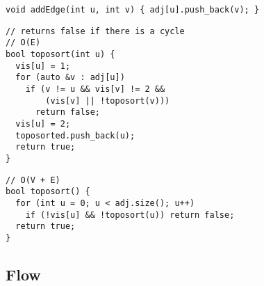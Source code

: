 \documentclass[twoside]{article}
\begin{document}
\begin{multicols*}{2}
\begin{verbatim}
void addEdge(int u, int v) { adj[u].push_back(v); }
\end{verbatim}
\vspace{-12pt}
\begin{verbatim}
// returns false if there is a cycle
// O(E)
bool toposort(int u) {
  vis[u] = 1;
  for (auto &v : adj[u])
    if (v != u && vis[v] != 2 &&
        (vis[v] || !toposort(v)))
      return false;
  vis[u] = 2;
  toposorted.push_back(u);
  return true;
}
\end{verbatim}
\vspace{-12pt}
\begin{verbatim}
// O(V + E)
bool toposort() {
  for (int u = 0; u < adj.size(); u++)
    if (!vis[u] && !toposort(u)) return false;
  return true;
}
\end{verbatim}

\subsectionfont{\bfseries\sffamily\centering\LARGE}
\vspace{0em}
\subsection*{Flow}
\vspace{2em}
\subsubsectionfont{\large\bfseries\sffamily\underline}

\end{multicols*}
\end{document}
